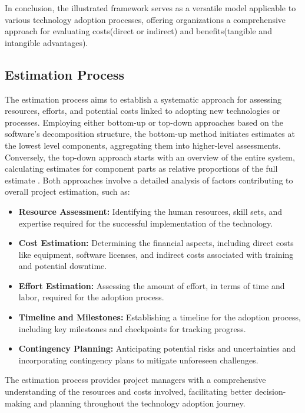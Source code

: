 \documentclass{article}
\begin{document}
\noindent In conclusion, the illustrated framework serves as a versatile model applicable to various technology adoption processes, offering organizations a comprehensive approach for evaluating costs(direct or indirect) and benefits(tangible and intangible advantages).

\subsection{Estimation Process}
The estimation process aims to establish a systematic approach for assessing resources, efforts, and potential costs linked to adopting new technologies or processes. Employing either bottom-up or top-down approaches based on the software's decomposition structure, the bottom-up method initiates estimates at the lowest level components, aggregating them into higher-level assessments. Conversely, the top-down approach starts with an overview of the entire system, calculating estimates for component parts as relative proportions of the full estimate \cite{reference4}. Both approaches involve a detailed analysis of factors contributing to overall project estimation, such as:
\begin{itemize}
    \item \textbf{Resource Assessment:} Identifying the human resources, skill sets, and expertise required for the successful implementation of the technology.
    \item \textbf{Cost Estimation:} Determining the financial aspects, including direct costs like equipment, software licenses, and indirect costs associated with training and potential downtime.
    \item \textbf{Effort Estimation:} Assessing the amount of effort, in terms of time and labor, required for the adoption process.
    \item \textbf{Timeline and Milestones:} Establishing a timeline for the adoption process, including key milestones and checkpoints for tracking progress.
    \item \textbf{Contingency Planning:} Anticipating potential risks and uncertainties and incorporating contingency plans to mitigate unforeseen challenges.
\end{itemize}

\noindent The estimation process provides project managers with a comprehensive understanding of the resources and costs involved, facilitating better decision-making and planning throughout the technology adoption journey.
\end{document}
